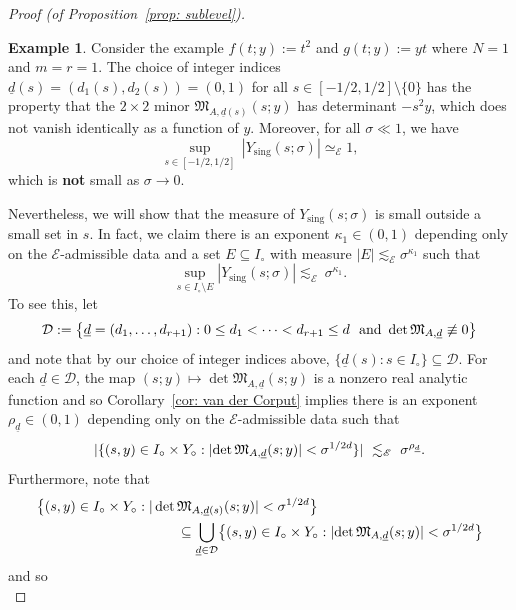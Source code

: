 \documentclass[reqno]{amsart}
\numberwithin{equation}{section}
\newcommand{\cD}{\mathcal{D}}
\newcommand{\sE}{\mathscr{E}}
\newcommand{\fM}{\mathfrak{M}}
\theoremstyle{plain}
\theoremstyle{definition}
\newtheorem{example}[theorem]{Example}
\begin{document}
\begin{proof}[Proof (of Proposition~\ref{prop: sublevel})]
\begin{example} Consider the example $f(t;y) := t^2$ and $g(t;y) := y t$ where $N=1$ and $m=r=1$. The choice of integer indices ${\underline{d}}(s) = (d_1(s), d_2(s)) = (0,1)$ for all $s\in [-1/2, 1/2] \setminus\{0\}$ has the property that the $2\times 2$ minor $\fM_{A,{\underline{d}}(s)}(s;y)$ has determinant $-s^2y$, which does not vanish identically as a function of $y$. Moreover, for all $\sigma \ll 1$, we have
\begin{equation*}
 \sup_{s\in [-1/2, 1/2]} \, |Y_{\mathrm{sing}}(s; \sigma)|  \simeq_{\sE} 1,   
\end{equation*}
which is \textbf{not} small as $\sigma \to 0$.
\end{example}

Nevertheless, we will show that the measure of $Y_{\mathrm{sing}}(s; \sigma)$ is small outside a small set in $s$. In fact,
we claim there is an 
exponent $\kappa_1 \in (0,1)$ depending only on the $\sE$-admissible data and a set $E \subseteq I_{\circ}$ with measure $|E| \lesssim_{\sE} \sigma^{\kappa_1}$
such that
\begin{equation}\label{eq: sublevel 3.6}
   \sup_{s \in I_{\circ}\setminus E}|Y_{\mathrm{sing}}(s; \sigma)| \lesssim_{\sE} \ \sigma^{\kappa_1}.
\end{equation}
To see this, let 
$$
\cD := \bigl\{{\underline{d}}= (d_1,\ldots, d_{r+1}): 0 \le d_1 < \cdots < d_{r+1} \le d \ \ {\rm and} \ \det \fM_{A,{\underline{d}}} \not\equiv 0 \bigr\}
$$
and note that by our choice of integer indices above, 
$\{{\underline{d}}(s): s \in I_{\circ}\} \subseteq \cD$. 
For each ${\underline{d}} \in \cD$, the map $(s;y) \mapsto \det  \fM_{A,{\underline{d}}}(s;y)$ is a nonzero real analytic function and so Corollary~\ref{cor: van der Corput} implies there is an exponent $\rho_{{\underline{d}}} \in (0,1)$ depending only on the $\sE$-admissible data such that
$$
|\{(s,y) \in I_{\circ} \times Y_{\circ} : |{\rm det} \, \fM_{A,{\underline{d}}}(s;y)| < \sigma^{1/2d} \}| \ \lesssim_{\sE} \ \sigma^{\rho_{{\underline{d}}}}.
$$
Furthermore, note that
\begin{align*}
    \big\{ (s,y) \in I_{\circ} \times Y_{\circ} :  |\det\, &\fM_{A, {\underline{d}}(s)}(s; y)| < \sigma^{1/2d} \big\} \\
    &\subseteq \bigcup_{{\underline{d}} \in \cD} \bigl\{ (s,y) \in I_{\circ} \times Y_{\circ} : |{\rm det} \, \fM_{A,{\underline{d}}}(s;y)| < \sigma^{1/2d} \bigr\}
\end{align*}
and so 
\begin{equation*}

\end{equation*}
\end{proof}
\end{document}
